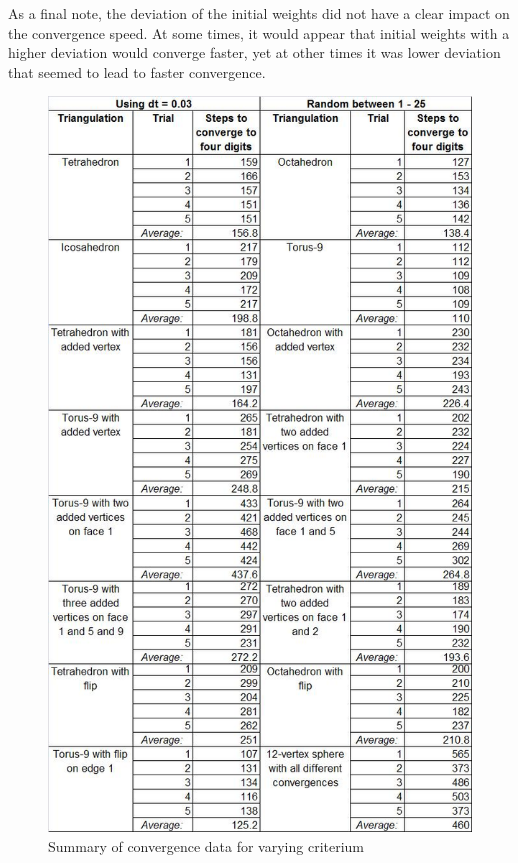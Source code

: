 \documentclass[12pt]{article}
\begin{document}
\noindent As a final note, the deviation of the initial weights did not have a clear impact on the convergence speed. At some times, it would appear that initial weights with a higher deviation would converge faster, yet at other times it was lower deviation that seemed to lead to faster convergence.

\begin{figure}
\centering
\includegraphics[scale = 0.79]{ConvergenceTable.png}
\caption{Summary of convergence data for varying criterium}
\label{fig:conv}
\end{figure}
\end{document}
